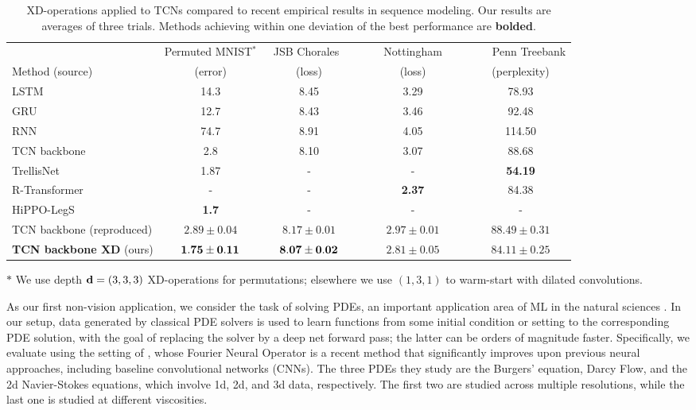 \begin{table*}[!t]
	\centering
	\begin{threeparttable}
		\begin{tabular}{lcccc}
			\hline
			& Permuted MNIST$^\ast$ & ~JSB Chorales~~ & ~~~~Nottingham~~~~ & ~~~Penn Treebank \\
			Method (source)  & (error) & (loss) & (loss) & (perplexity) \\
			\hline
			LSTM \citep{bai2018tcn} & 14.3 & 8.45 & 3.29 & 78.93 \\
			GRU \citep{bai2018tcn} & 12.7 & 8.43 & 3.46 & 92.48 \\
			RNN \citep{bai2018tcn} & 74.7 & 8.91 & 4.05 & 114.50 \\
			TCN backbone \citep{bai2018tcn} & 2.8 & 8.10 & 3.07 & 88.68 \\
			TrellisNet \citep{bai2019trellis} & 1.87 & - & - & {\bf 54.19} \\
			R-Transformer \citep{wang2020rtransformer} & - & - & {\bf 2.37} & 84.38 \\
			HiPPO-LegS \citep{gu2020hippo} & {\bf 1.7} & - & - & - \\
			\hline
			TCN backbone (reproduced) & $2.89\pm0.04$ & $8.17\pm0.01$ & $2.97\pm0.01$ & $88.49\pm0.31$ \\
			{\bf TCN backbone XD} (ours) & ${\bf 1.75\pm0.11}$ & ${\bf 8.07\pm0.02}$ & $2.81\pm0.05$ & $84.11\pm0.25$ \\
			\hline
		\end{tabular}
		\begin{tablenotes}\footnotesize
			\item[$\ast$] We use depth $\mathbf{d}=(3,3,3)$ XD-operations for permutations;
			elsewhere we use $(1,3,1)$ to warm-start with dilated convolutions.\vspace{-4pt}
		\end{tablenotes}
		\caption{\label{tab:seq}
			XD-operations applied to TCNs compared to recent empirical results in sequence modeling.
			Our results are averages of three trials.
			Methods achieving within one deviation of the best performance are {\bf bolded}.
		}
	\end{threeparttable}
\end{table*}

As our first non-vision application, we consider the task of solving PDEs, an important application area of ML in the natural sciences \citep{li2015butterfly, li2018multidimensional, sirignano2018dgm}.
In our setup, data generated by classical PDE solvers is used to learn functions from some initial condition or setting to the corresponding PDE solution, with the goal of replacing the solver by a deep net forward pass;
the latter can be orders of magnitude faster.
Specifically, we evaluate using the setting of \citet{li2021fno}, whose Fourier Neural Operator is a recent method that significantly improves upon previous neural approaches, including baseline convolutional networks (CNNs).
The three PDEs they study are the Burgers' equation, Darcy Flow, and the 2d Navier-Stokes equations, which involve 1d, 2d, and 3d data, respectively.
The first two are studied across multiple resolutions, while the last one is studied at different viscosities.

